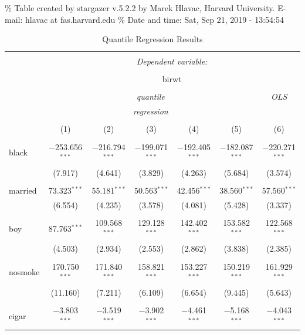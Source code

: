 \documentclass[]{book}
\begin{document}
\% Table created by stargazer v.5.2.2 by Marek Hlavac, Harvard
University. E-mail: hlavac at fas.harvard.edu \% Date and time: Sat, Sep
21, 2019 - 13:54:54

\begin{table}[!htbp] \centering 
  \caption{Quantile Regression Results} 
  \label{tab:} 
\begin{tabular}{@{\extracolsep{5pt}}lcccccc} 
\\[-1.8ex]\hline 
\hline \\[-1.8ex] 
 & \multicolumn{6}{c}{\textit{Dependent variable:}} \\ 
\cline{2-7} 
\\[-1.8ex] & \multicolumn{6}{c}{birwt} \\ 
\\[-1.8ex] & \multicolumn{5}{c}{\textit{quantile}} & \textit{OLS} \\ 
 & \multicolumn{5}{c}{\textit{regression}} & \textit{} \\ 
\\[-1.8ex] & (1) & (2) & (3) & (4) & (5) & (6)\\ 
\hline \\[-1.8ex] 
 black & $-$253.656$^{***}$ & $-$216.794$^{***}$ & $-$199.071$^{***}$ & $-$192.405$^{***}$ & $-$182.087$^{***}$ & $-$220.271$^{***}$ \\ 
  & (7.917) & (4.641) & (3.829) & (4.263) & (5.684) & (3.574) \\ 
  & & & & & & \\ 
 married & 73.323$^{***}$ & 55.181$^{***}$ & 50.563$^{***}$ & 42.456$^{***}$ & 38.560$^{***}$ & 57.560$^{***}$ \\ 
  & (6.554) & (4.235) & (3.578) & (4.081) & (5.428) & (3.337) \\ 
  & & & & & & \\ 
 boy & 87.763$^{***}$ & 109.568$^{***}$ & 129.128$^{***}$ & 142.402$^{***}$ & 153.582$^{***}$ & 122.568$^{***}$ \\ 
  & (4.503) & (2.934) & (2.553) & (2.862) & (3.838) & (2.385) \\ 
  & & & & & & \\ 
 nosmoke & 170.750$^{***}$ & 171.840$^{***}$ & 158.821$^{***}$ & 153.227$^{***}$ & 150.219$^{***}$ & 161.929$^{***}$ \\ 
  & (11.160) & (7.211) & (6.109) & (6.654) & (9.445) & (5.643) \\ 
  & & & & & & \\ 
 cigar & $-$3.803$^{***}$ & $-$3.519$^{***}$ & $-$3.902$^{***}$ & $-$4.461$^{***}$ & $-$5.168$^{***}$ & $-$4.043$^{***}$ \\ 

\end{tabular}
\end{table}
\end{document}
